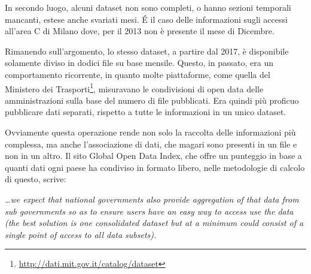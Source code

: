 \documentclass[a4paper,12pt]{report}
\newcommand{\quotestyle}[1]{\textit{#1}}
\begin{document}
In secondo luogo, alcuni dataset non sono completi, o hanno sezioni temporali mancanti,
estese anche svariati mesi. 
\'E il caso delle informazioni sugli accessi all'area C di Milano dove, 
per il 2013 non è presente il mese di Dicembre.

Rimanendo sull'argomento, lo stesso dataset, a partire dal 2017, è disponibile 
solamente diviso in dodici file su base mensile.
Questo, in passato, era un comportamento ricorrente, in 
quanto molte piattaforme, come quella del Ministero dei 
Trasporti\footnote{\url{http://dati.mit.gov.it/catalog/dataset}}, 
misuravano le condivisioni di open data delle amministrazioni 
sulla base del numero di file pubblicati.
Era quindi più proficuo pubblicare dati separati, rispetto a tutte le informazioni in 
un unico dataset.

Ovviamente questa operazione rende non solo la raccolta delle informazioni più complessa, 
ma anche l'associazione di dati, che magari sono presenti in un file e non in un altro. 
Il sito Global Open Data Index, che offre un punteggio in base a quanti dati ogni paese 
ha condiviso in formato libero, nelle metodologie di calcolo di questo, scrive: 

\begin{center}
    \quotestyle{\dots we expect that national governments also provide aggregation 
    of that data from 
    sub governments so as to ensure users have an easy way to access use the data 
    (the best solution is one consolidated dataset but at a minimum could consist of a 
    single point of access to all data subsets).}\cite{OPENDATAINDEX:1}
\end{center}
\end{document}
